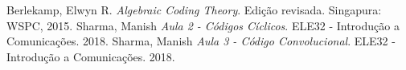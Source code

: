 \begin{thebibliography}{1}

Berlekamp, Elwyn R. \emph{Algebraic Coding Theory}. Edição revisada. Singapura: WSPC, 2015. 
Sharma, Manish \emph{Aula 2 - Códigos Cíclicos}. ELE32 - Introdução a Comunicações. 2018.
Sharma, Manish \emph{Aula 3 - Código Convolucional}. ELE32 - Introdução a Comunicações. 2018. 

\end{thebibliography}